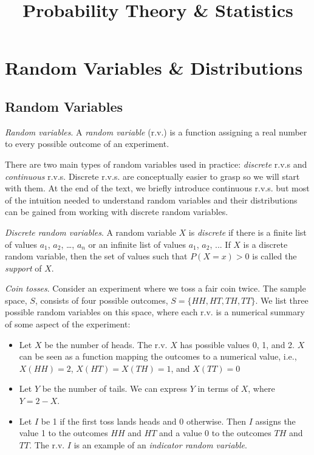\documentclass[11pt,a4paper]{article}
\title{Probability Theory \& Statistics}
\begin{document}
\maketitle
\newpage

\section{Random Variables \& Distributions}

\subsection{Random Variables}

\emph{Random variables}. 
A \emph{random variable} (r.v.) is a function
assigning a real number to every possible outcome of an experiment.

There are two main types of random variables used in practice:
\emph{discrete} r.v.s and \emph{continuous} r.v.s. 
Discrete r.v.s. are conceptually easier to grasp so we will start with them. 
At the end of the text, 
we briefly introduce continuous r.v.s. 
but most of the intuition needed to understand random variables and their distributions
can be gained from working with discrete random variables.

\emph{Discrete random variables}. 
A random variable \(X\) is \emph{discrete} if there is a finite list of values \(a_{1}\),
\(a_{2}\), \ldots, \(a_{n}\) or an infinite list of values \(a_{1}\),
\(a_{2}\), ... If \(X\) is a discrete random variable, then the set of
values such that \(P(X = x) > 0\) is called the \emph{support} of \(X\).

\emph{Coin tosses}. 
Consider an experiment where we toss a fair coin twice. 
The sample space, \(S\), 
consists of four possible outcomes,
\(S = \{HH,HT,TH,TT\}\). 
We list three possible random variables on this space, 
where each r.v. is a numerical summary of some aspect of the
experiment:
\begin{itemize}
\item
Let \(X\) be the number of heads. 
The r.v. \(X\) has possible values 0, 1, and 2. 
\(X\) can be seen as a function mapping the outcomes to a numerical value, 
i.e., \(X(HH) = 2\), \(X(HT) = X(TH) = 1\), and \(X(TT) = 0\)
\item
Let \(Y\) be the number of tails. 
We can express \(Y\) in terms of \(X\), 
where \(Y = 2 - X\).
\item
Let \(I\) be 1 if the first toss lands heads and 0 otherwise. 
Then \(I\) assigns the value 1 to the outcomes \(HH\) and \(HT\) and a
value 0 to the outcomes \(TH\) and \(TT\). 
The r.v. \(I\) is an example of an \emph{indicator random variable}.
\end{itemize}
\end{document}
